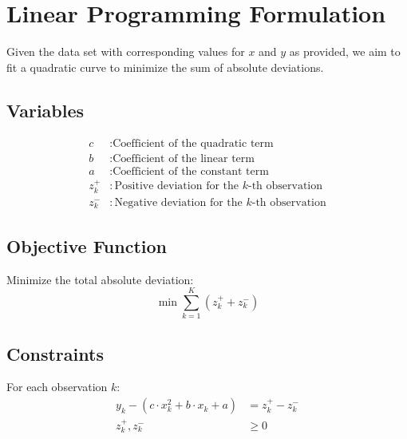 \documentclass{article}
\begin{document}
\section*{Linear Programming Formulation}

Given the data set with corresponding values for \(x\) and \(y\) as provided, we aim to fit a quadratic curve to minimize the sum of absolute deviations.

\subsection*{Variables}
\begin{align*}
c & : \text{Coefficient of the quadratic term} \\
b & : \text{Coefficient of the linear term} \\
a & : \text{Coefficient of the constant term} \\
z_k^+ & : \text{Positive deviation for the } k\text{-th observation} \\
z_k^- & : \text{Negative deviation for the } k\text{-th observation}
\end{align*}

\subsection*{Objective Function}
Minimize the total absolute deviation:
\[
\min \sum_{k=1}^{K} (z_k^+ + z_k^-)
\]

\subsection*{Constraints}
For each observation \(k\):
\begin{align*}
y_k - (c \cdot x_k^2 + b \cdot x_k + a) &= z_k^+ - z_k^- \\
z_k^+, z_k^- & \geq 0
\end{align*}
\end{document}
